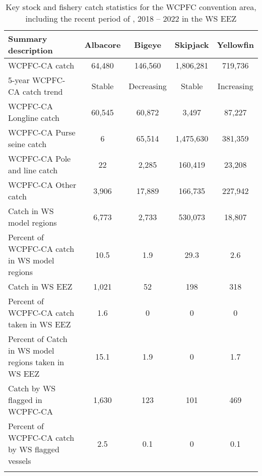 \begin{longtable}{lcccc}
\caption{Key stock and fishery catch statistics for the WCPFC convention area, including the recent period of , 2018 -- 2022 in the WS EEZ} \\ 
  \hline
Summary description & Albacore & Bigeye & Skipjack & Yellowfin \\ 
  \hline
WCPFC-CA catch & 64,480 & 146,560 & 1,806,281 & 719,736 \\ 
  5-year WCPFC-CA catch trend & Stable & Decreasing & Stable & Increasing \\ 
  WCPFC-CA Longline catch & 60,545 & 60,872 & 3,497 & 87,227 \\ 
  WCPFC-CA Purse seine catch & 6 & 65,514 & 1,475,630 & 381,359 \\ 
  WCPFC-CA Pole and line catch & 22 & 2,285 & 160,419 & 23,208 \\ 
  WCPFC-CA Other catch & 3,906 & 17,889 & 166,735 & 227,942 \\ 
  Catch in WS model regions & 6,773 & 2,733 & 530,073 & 18,807 \\ 
  Percent of WCPFC-CA catch in WS model regions & 10.5 & 1.9 & 29.3 & 2.6 \\ 
   \hline
Catch in WS EEZ & 1,021 & 52 & 198 & 318 \\ 
  Percent of WCPFC-CA catch taken in WS EEZ & 1.6 & 0 & 0 & 0 \\ 
  Percent of Catch in WS model regions taken in WS EEZ & 15.1 & 1.9 & 0 & 1.7 \\ 
  Catch by WS flagged in WCPFC-CA & 1,630 & 123 & 101 & 469 \\ 
  Percent of WCPFC-CA catch by WS flagged vessels & 2.5 & 0.1 & 0 & 0.1 \\ 
  \hline
\label{cat_sum_tab}
\end{longtable}
